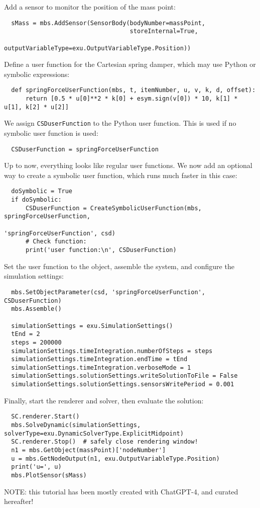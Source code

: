 %
Add a sensor to monitor the position of the mass point:
\pythonstyle\begin{lstlisting}
  sMass = mbs.AddSensor(SensorBody(bodyNumber=massPoint,
                                   storeInternal=True,
                                   outputVariableType=exu.OutputVariableType.Position))
\end{lstlisting}
%
Define a user function for the Cartesian spring damper, which may use Python or symbolic expressions:
\pythonstyle\begin{lstlisting}
  def springForceUserFunction(mbs, t, itemNumber, u, v, k, d, offset):
      return [0.5 * u[0]**2 * k[0] + esym.sign(v[0]) * 10, k[1] * u[1], k[2] * u[2]]
\end{lstlisting}
%
We assign \texttt{CSDuserFunction} to the Python user function. This is used if no symbolic user function is used:
\pythonstyle\begin{lstlisting}
  CSDuserFunction = springForceUserFunction
\end{lstlisting}
%
Up to now, everything looks like regular user functions. We now add an optional way to create a symbolic user function, which runs much faster in this case:
\pythonstyle\begin{lstlisting}
  doSymbolic = True
  if doSymbolic:
      CSDuserFunction = CreateSymbolicUserFunction(mbs, springForceUserFunction,
                                                   'springForceUserFunction', csd)
      # Check function:
      print('user function:\n', CSDuserFunction)
\end{lstlisting}
%
Set the user function to the object, assemble the system, and configure the simulation settings:
\pythonstyle\begin{lstlisting}
  mbs.SetObjectParameter(csd, 'springForceUserFunction', CSDuserFunction)
  mbs.Assemble()

  simulationSettings = exu.SimulationSettings()
  tEnd = 2
  steps = 200000
  simulationSettings.timeIntegration.numberOfSteps = steps
  simulationSettings.timeIntegration.endTime = tEnd
  simulationSettings.timeIntegration.verboseMode = 1
  simulationSettings.solutionSettings.writeSolutionToFile = False
  simulationSettings.solutionSettings.sensorsWritePeriod = 0.001
\end{lstlisting}
%
Finally, start the renderer and solver, then evaluate the solution:
\pythonstyle\begin{lstlisting}
  SC.renderer.Start()
  mbs.SolveDynamic(simulationSettings, solverType=exu.DynamicSolverType.ExplicitMidpoint)
  SC.renderer.Stop()  # safely close rendering window!
  n1 = mbs.GetObject(massPoint)['nodeNumber']
  u = mbs.GetNodeOutput(n1, exu.OutputVariableType.Position)
  print('u=', u)
  mbs.PlotSensor(sMass)
\end{lstlisting}
%
NOTE: this tutorial has been mostly created with ChatGPT-4, and curated hereafter!


